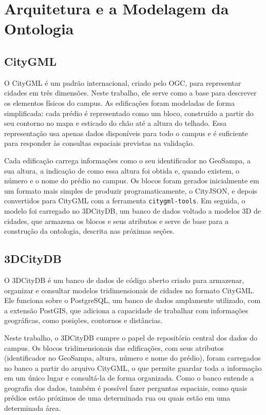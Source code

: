 \documentclass[
  article,   %
  11pt,      %
  oneside,   %
  a4paper,   %
  english,   %
  brazil,    %
  sumario=tradicional
]{abntex2}
\begin{document}
\section{Arquitetura e a Modelagem da Ontologia}

\subsection{CityGML}

O CityGML é um padrão internacional, criado pelo OGC, para representar cidades em três dimensões.
Neste trabalho, ele serve como a base para descrever os elementos físicos do campus.
As edificações foram modeladas de forma simplificada: cada prédio é representado como um bloco,
construído a partir do seu contorno no mapa e esticado do chão até a altura do telhado.
Essa representação usa apenas dados disponíveis para todo o campus e é suficiente para responder às
consultas espaciais previstas na validação.

Cada edificação carrega informações como o seu identificador no GeoSampa, a sua altura, a indicação
de como essa altura foi obtida e, quando existem, o número e o nome do prédio no campus.
Os blocos foram gerados inicialmente em um formato mais simples de produzir programaticamente, o
CityJSON, e depois convertidos para CityGML com a ferramenta \texttt{citygml-tools}.
Em seguida, o modelo foi carregado no 3DCityDB, um banco de dados voltado a modelos 3D de cidades,
que armazena os blocos e seus atributos e serve de base para a construção da ontologia, descrita
nas próximas seções.

\subsection{3DCityDB}

O 3DCityDB é um banco de dados de código aberto criado para armazenar, organizar e consultar
modelos tridimensionais de cidades no formato CityGML.
Ele funciona sobre o PostgreSQL, um banco de dados amplamente utilizado, com a extensão PostGIS,
que adiciona a capacidade de trabalhar com informações geográficas, como posições, contornos e
distâncias.

Neste trabalho, o 3DCityDB cumpre o papel de repositório central dos dados do campus.
Os blocos tridimensionais das edificações, com seus atributos (identificador no GeoSampa, altura,
número e nome do prédio), foram carregados no banco a partir do arquivo CityGML, o que permite
guardar toda a informação em um único lugar e consultá-la de forma organizada.
Como o banco entende a geografia dos dados, também é possível fazer perguntas espaciais, como quais
prédios estão próximos de uma determinada rua ou quais estão em uma determinada área.
\end{document}
